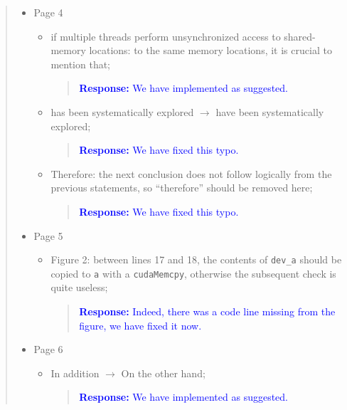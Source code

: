 \documentclass[11pt]{article}
\begin{document}
\begin{quote}
\begin{itemize}
\begin{itemize}
  \end{itemize}
\item Page 4
  \begin{itemize}
  \item if multiple threads perform unsynchronized access to shared-memory locations: to the same memory locations, it is crucial to mention that;
  
    \begin{quote}
    \textcolor{blue}{\textbf{Response:} We have implemented as suggested.}
    \end{quote}

  \item has been systematically explored $\rightarrow$ have been systematically explored;
  
    \begin{quote}
    \textcolor{blue}{\textbf{Response:} We have fixed this typo.}
    \end{quote}

  \item Therefore: the next conclusion does not follow logically from the previous statements, so ``therefore'' should be removed here;
  
    \begin{quote}
    \textcolor{blue}{\textbf{Response:} We have fixed this typo.}
    \end{quote}

  \end{itemize}
\item Page 5
  \begin{itemize}
  \item Figure 2: between lines 17 and 18, the contents of {\tt dev\_a} should be copied to {\tt a} with a {\tt cudaMemcpy}, otherwise the subsequent check is quite useless;
  
    \begin{quote}
    \textcolor{blue}{\textbf{Response:} Indeed, there was a code line missing from the figure, we have fixed it now.}
    \end{quote}

  \end{itemize}
\item Page 6
  \begin{itemize}
  \item In addition $\rightarrow$ On the other hand;
  
    \begin{quote}
    \textcolor{blue}{\textbf{Response:} We have implemented as suggested.}
    \end{quote}


\end{itemize}
\end{itemize}
\end{quote}
\end{document}
